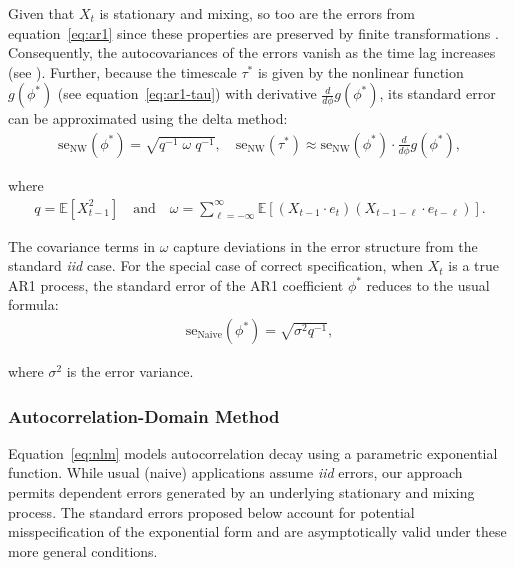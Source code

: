 \documentclass[docs/main.tex]{subfiles}
\begin{document}
Given that $X_t$ is stationary and mixing, so too are the errors from equation~\eqref{eq:ar1} since these properties are preserved by finite transformations \citep[Theorem~14.2 and Theorem~14.12]{hansen_econometrics_2022}. Consequently, the autocovariances of the errors vanish as the time lag increases (see ). Further, because the timescale $\tau^*$ is given by the nonlinear function $g(\phi^*)$ (see equation~\eqref{eq:ar1-tau}) with derivative $\frac{d}{d\phi} g(\phi^*)$, its standard error can be approximated using the delta method:
\begin{align}
    \text{se}_{\text{NW}}(\phi^*) = \sqrt{q^{-1}\; \omega \; q^{-1}} \label{eq:se-ar1-phi}, \quad
    \text{se}_{\text{NW}}(\tau^*) \approx \text{se}_{\text{NW}}(\phi^*) \cdot \frac{d}{d\phi} g(\phi^*),
\end{align}

\noindent where
\begin{align}
    q = \mathbb{E}[X_{t-1}^2] \quad\text{and}\quad \omega = \sum_{\ell=-\infty}^{\infty} \mathbb{E}[(X_{t-1} \cdot e_t)(X_{t-1-\ell} \cdot e_{t-\ell})].
\end{align}

\noindent The covariance terms in $\omega$ capture deviations in the error structure from the standard \textit{iid} case. For the special case of correct specification, when $X_t$ is a true AR1 process, the standard error of the AR1 coefficient $\phi^*$ reduces to the usual formula:
\begin{align}
    \text{se}_{\text{Naive}}(\phi^*) = \sqrt{\sigma^2 q^{-1}},
\end{align}

\noindent where $\sigma^2$ is the error variance. \\

\subsubsection{Autocorrelation-Domain Method}\label{sec:stderr-autocorrelation-domain}
Equation~\eqref{eq:nlm} models autocorrelation decay using a parametric exponential function. While usual (naive) applications assume \textit{iid} errors, our approach permits dependent errors generated by an underlying stationary and mixing process. The standard errors proposed below account for potential misspecification of the exponential form and are asymptotically valid under these more general conditions.\\
\end{document}
